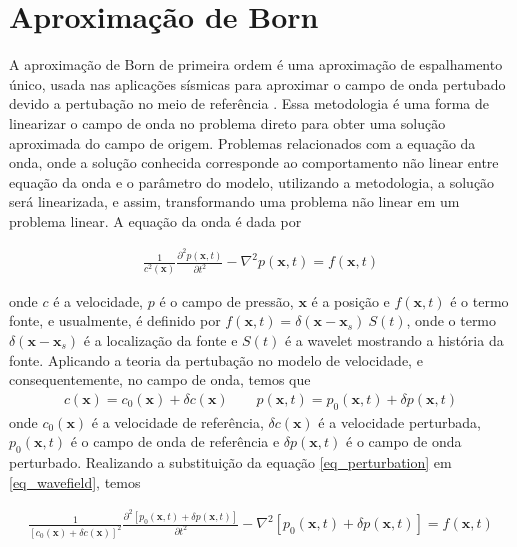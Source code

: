 \section{Aproximação de Born}
A aproximação de Born de primeira ordem é uma aproximação de espalhamento único, usada nas aplicações sísmicas para aproximar o campo de onda pertubado devido a pertubação no meio de referência \citep{tarantola_2005, keys_1983}. Essa metodologia é uma forma de linearizar o campo de onda no problema direto para obter uma solução aproximada do campo de origem. Problemas relacionados com a equação da onda, onde a solução conhecida corresponde ao comportamento não linear entre equação da onda e o parâmetro do modelo, utilizando a metodologia, a solução será linearizada, e assim, transformando uma problema não linear em um problema linear. A equação da onda é dada por

\begin{eqnarray}
\frac{1}{c^{2}(\mathbf{x})} \frac{\partial^{2} p(\mathbf{x},t) }{\partial t^{2}} - \nabla^{2} p(\mathbf{x},t) = f(\mathbf{x},t)
\label{eq_wavefield}
\end{eqnarray}

onde $c$ é a velocidade, $p$ é o campo de pressão, $\mathbf{x}$ é a posição e $f(\mathbf{x},t)$ é o termo fonte, e usualmente, é definido por $f(\mathbf{x},t) = \delta (\mathbf{x}-\mathbf{x}_{s})~S(t)$, onde o termo $\delta (\mathbf{x}-\mathbf{x}_{s})$ é a localização da fonte e $S(t)$ é a wavelet mostrando a história da fonte. Aplicando a teoria da pertubação no modelo de velocidade, e consequentemente, no campo de onda, temos que
\begin{eqnarray}
 c(\mathbf{x}) = c_{0}(\mathbf{x}) + \delta c(\mathbf{x}) ~~~~~~~~~ p(\mathbf{x},t) = p_{0}(\mathbf{x},t) + \delta p(\mathbf{x},t)
 \label{eq_perturbation}
\end{eqnarray}
onde $c_{0}(\mathbf{x})$ é a velocidade de referência, $\delta c(\mathbf{x})$ é a velocidade perturbada, $p_{0}(\mathbf{x},t)$ é o campo de onda de referência e $\delta p(\mathbf{x},t)$ é o campo de onda perturbado.
Realizando a substituição da equação \ref{eq_perturbation} em \ref{eq_wavefield}, temos

\begin{eqnarray}
 \frac{1}{\left[c_{0}(\mathbf{x})+\delta c(\mathbf{x})\right]^{2}} \frac{\partial^{2} \left[p_{0}(\mathbf{x},t) + \delta p(\mathbf{x},t) \right]}{\partial t^{2}} - \nabla^{2} \left[p_{0}(\mathbf{x},t)+ \delta p(\mathbf{x},t) \right] = f(\mathbf{x},t)
 \label{eq_wavefield_perturbation}
\end{eqnarray}

